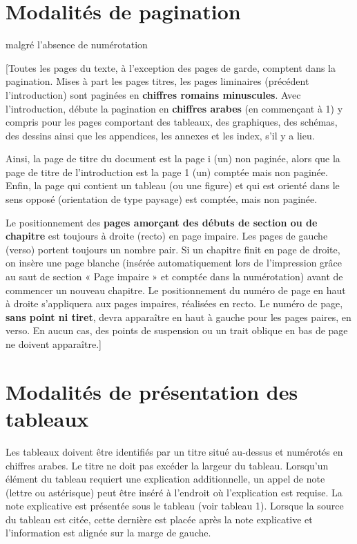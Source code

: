 \section*{Modalités de pagination} %
malgré l'absence de numérotation

[Toutes les pages du texte, à l’exception des pages de garde, comptent dans la pagination. Mises à part les pages titres, les pages liminaires
(précédent l’introduction) sont paginées en \textbf{chiffres romains minuscules}. Avec l’introduction, débute la pagination en \textbf{chiffres
arabes} (en commençant à 1) y compris pour les pages comportant des tableaux, des graphiques, des schémas, des dessins ainsi que les appendices, les
annexes et les index, s'il y a lieu.

Ainsi, la page de titre du document est la page i (un) non paginée, alors que la page de titre de l’introduction est la page 1 (un) comptée mais non
paginée. Enfin, la page qui contient un tableau (ou une figure) et qui est orienté dans le sens opposé (orientation de type paysage) est comptée, mais
non paginée.

Le positionnement des \textbf{pages amorçant des débuts de section ou de chapitre} est toujours à droite (recto) en page impaire. Les pages de gauche
(verso) portent toujours un nombre pair. Si un chapitre finit en page de droite, on insère une page blanche (insérée automatiquement lors de
l’impression grâce au saut de section « Page impaire » et comptée dans la numérotation) avant de commencer un nouveau chapitre. Le positionnement du
numéro de page en haut à droite s’appliquera aux pages impaires, réalisées en recto. Le numéro de page, \textbf{sans point ni tiret}, devra apparaître
en haut à gauche pour les pages paires, en verso. En aucun cas, des points de suspension ou un trait oblique en bas de page ne doivent apparaître.]

\section*{Modalités de présentation des tableaux} 

Les tableaux doivent être identifiés par un titre situé au-dessus et numérotés en chiffres arabes. Le titre ne doit pas excéder la largeur du tableau.
Lorsqu’un élément du tableau requiert une explication additionnelle, un appel de note (lettre ou astérisque) peut être inséré à l’endroit où
l’explication est requise. La note explicative est présentée sous le tableau (voir tableau 1). Lorsque la source du tableau est citée, cette dernière
est placée après la note explicative et l’information est alignée sur la marge de gauche.

